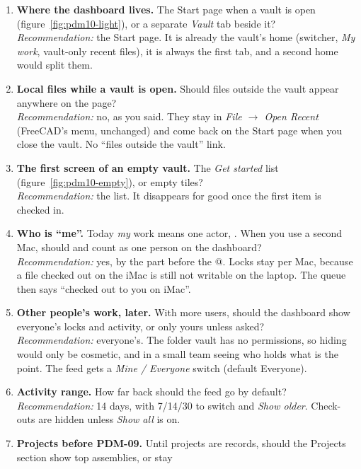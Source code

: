 \begin{enumerate}
  \item \textbf{Where the dashboard lives.} The Start page when a vault is open (figure~\ref{fig:pdm10-light}), or a separate
        \emph{Vault} tab beside it?\\
        \emph{Recommendation:} the Start page. It is already the vault's home (switcher, \emph{My work}, vault-only recent
        files), it is always the first tab, and a second home would split them.
  \item \textbf{Local files while a vault is open.} Should files outside the vault appear anywhere on the page?\\
        \emph{Recommendation:} no, as you said. They stay in \emph{File $\rightarrow$ Open Recent} (FreeCAD's menu, unchanged)
        and come back on the Start page when you close the vault. No ``files outside the vault'' link.
  \item \textbf{The first screen of an empty vault.} The \emph{Get started} list (figure~\ref{fig:pdm10-empty}), or empty tiles?\\
        \emph{Recommendation:} the list. It disappears for good once the first item is checked in.
  \item \textbf{Who is ``me''.} Today \emph{my} work means one actor, . When you use a second Mac, should
         and  count as one person on the dashboard?\\
        \emph{Recommendation:} yes, by the part before the @. Locks stay per Mac, because a file checked out on the iMac
        is still not writable on the laptop. The queue then says ``checked out to you on iMac''.
  \item \textbf{Other people's work, later.} With more users, should the dashboard show everyone's locks and activity, or only
        yours unless asked?\\
        \emph{Recommendation:} everyone's. The folder vault has no permissions, so hiding would only be cosmetic, and in a
        small team seeing who holds what is the point. The feed gets a \emph{Mine / Everyone} switch (default Everyone).
  \item \textbf{Activity range.} How far back should the feed go by default?\\
        \emph{Recommendation:} 14 days, with 7/14/30 to switch and \emph{Show older}. Check-outs are hidden unless
        \emph{Show all} is on.
  \item \textbf{Projects before PDM-09.} Until projects are records, should the Projects section show top assemblies, or stay

\end{enumerate}
